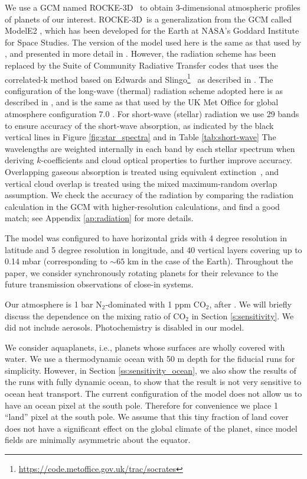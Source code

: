 \documentclass[11pt,numberedappendix,twocolappendix,]{emulateapj}
\def\modelE{ROCKE-3D}
\begin{document}
We use a GCM named \modelE \ \citep{Way2017} to obtain 3-dimensional atmospheric profiles of planets of our interest. 
\modelE \ is a generalization from the GCM called ModelE2 \citep{Schmidt2014}, which has been developed for the Earth at NASA's Goddard Institute for Space Studies. 
%
The version of the model used here is the same as that used by \citet{Way2016}, and presented in more detail in \citet{Way2017}.
However, the radiation scheme has been replaced by the Suite of Community Radiative Transfer codes that uses the correlated-k method based on Edwards and Slingo\footnote{\url{https://code.metoffice.gov.uk/trac/socrates}}~\citep[SOCRATES,][]{EdwardsSlingo1996,Edwards1996} as described in \citet{Way2017}. 
The configuration of the long-wave (thermal) radiation scheme adopted here is as described in \citet{Way2017}, and is the same as that used by the UK Met Office for global atmosphere configuration 7.0 \citep[GA7.0][]{Walters2017}. 
For short-wave (stellar) radiation we use 29 bands to ensure accuracy of the short-wave absorption, as indicated by the black vertical lines in Figure \ref{fig:star_spectra} and in Table \ref{tab:short-wave}
The wavelengths are weighted internally in each band by each stellar spectrum when deriving $k$-coefficients and cloud optical properties to further improve accuracy. 
Overlapping gaseous absorption is treated using equivalent extinction~\citep{Edwards1996,Amundsen2016}, and vertical cloud overlap is treated using the mixed maximum-random overlap assumption. 
We check the accuracy of the radiation by comparing the radiation calculation in the GCM with higher-resolution calculations, and find a good match;  see Appendix \ref{ap:radiation} for more details. 

The model was configured to have horizontal grids with 4 degree resolution in latitude and 5 degree resolution in longitude, and 40 vertical layers covering up to 0.14 mbar (corresponding to $\sim 65$ km in the case of the Earth). 
Throughout the paper, we consider synchronously rotating planets for their  relevance to the future transmission observations of close-in systems. 

Our atmosphere is 1 bar N$_2$-dominated with 1 ppm CO$_2$, after  \citet{Kopparapu2016}. 
We will briefly discuss the dependence on the mixing ratio of CO$_2$ in Section \ref{s:sensitivity}. 
We did not include aerosols. 
Photochemistry is disabled in our model. 

We consider aquaplanets, i.e., planets whose surfaces are wholly covered with water. 
We use a thermodynamic ocean with 50 m depth for the fiducial runs for simplicity. 
However, in Section \ref{ss:sensitivity_ocean}, we also show the results of the runs with fully dynamic ocean, to show that the result is not very sensitive to ocean heat transport. 
The current configuration of the model does not allow us to have an ocean pixel at the south pole. Therefore for convenience we place 1 ``land'' pixel at the south pole. We assume that this tiny fraction of land cover does not have a significant effect on the global climate of the planet, since model fields are minimally asymmetric about the equator. 
\end{document}
